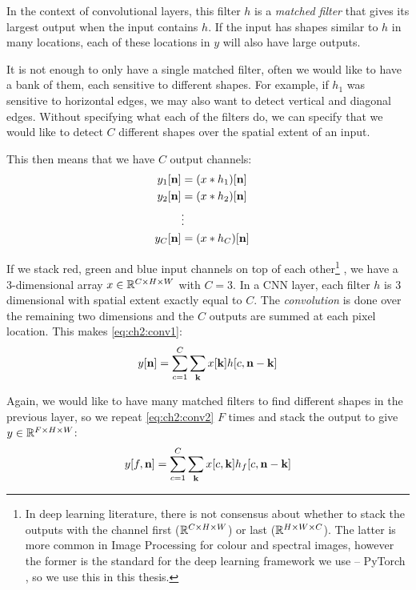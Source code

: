 In the context of convolutional layers, this filter $h$ is a \emph{matched filter} 
that gives its largest output when the input contains $h$. If the input has
shapes similar to $h$ in many locations, each of these locations in $y$ will
also have large outputs. 

It is not enough to only have a single matched filter, often we would like to
have a bank of them, each sensitive to different shapes. For example, if $h_1$
was sensitive to horizontal edges, we may also want to detect vertical and
diagonal edges. Without specifying what each of the filters do, we can 
specify that we would like to detect $C$ different shapes over the spatial
extent of an input.

This then means that we have $C$ output channels:
\begin{align*}
  y_1[\nn] &= (x \conv h_1)[\nn] \\
  y_2[\nn] &= (x \conv h_2)[\nn] \\
           &\vdots & \\
  y_C[\nn] &= (x \conv h_C)[\nn] 
\end{align*}

If we stack red, green and blue input channels on top of each other\footnote{In deep 
learning literature, there is not consensus about whether to stack the outputs
with the channel first ($\reals[C\x H\x W]$) or last ($\reals[H\x W\x C]$). The
latter is more common in Image Processing for colour and spectral images,
however the former is the standard for the deep learning framework we use --
PyTorch \cite{paszke_automatic_2017}, so we use this in this thesis.} , we have a 
3-dimensional array $x \in \reals[C\x H\x W]$ with $C=3$.
In a CNN layer, each filter $h$ is 3 dimensional with spatial extent exactly
equal to $C$. The \emph{convolution} is done over the remaining two dimensions
and the $C$ outputs are summed at each pixel location. This makes
\eqref{eq:ch2:conv1}:
\begin{equation}
  y[\nn] = \sum_{c=1}^C \sum_{\mathbf{k}} x[\mathbf{k}]h[c, \nn-\mathbf{k}]
  \label{eq:ch2:conv2}
\end{equation}

Again, we would like to have many matched filters to find different shapes in
the previous layer, so we repeat \autoref{eq:ch2:conv2} $F$ times and stack the
output to give $y \in \reals[F \x H\x W]$: 
%
\begin{equation}
  y[f, \nn] = \sum_{c=1}^C \sum_{\mathbf{k}} x[c, \mathbf{k}]h_f[c, \nn-\mathbf{k}]
  \label{eq:ch2:conv3}
\end{equation}

